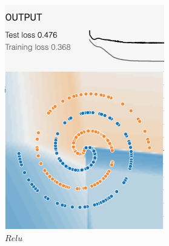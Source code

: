 \documentclass[12pt,a4paper]{article}
\begin{document}
\begin{enumerate}
\begin{figure}[H]
\begin{subfigure}[H]{0.2\textwidth}
				\includegraphics[width=\textwidth]{Figures/activation/relu}
				\caption{$Relu$}
			\end{subfigure}
			\begin{subfigure}[H]{0.2\textwidth}
				\centering

\end{subfigure}
\end{figure}
\end{enumerate}
\end{document}
